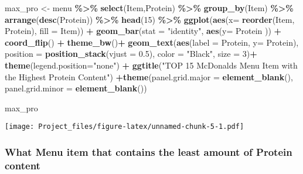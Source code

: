 \documentclass[
]{article}
\newenvironment{Shaded}{\begin{snugshade}}{\end{snugshade}}
\newcommand{\AttributeTok}[1]{\textcolor[rgb]{0.13,0.29,0.53}{#1}}
\newcommand{\DecValTok}[1]{\textcolor[rgb]{0.00,0.00,0.81}{#1}}
\newcommand{\FloatTok}[1]{\textcolor[rgb]{0.00,0.00,0.81}{#1}}
\newcommand{\FunctionTok}[1]{\textcolor[rgb]{0.13,0.29,0.53}{\textbf{#1}}}
\newcommand{\NormalTok}[1]{#1}
\newcommand{\OtherTok}[1]{\textcolor[rgb]{0.56,0.35,0.01}{#1}}
\newcommand{\SpecialCharTok}[1]{\textcolor[rgb]{0.81,0.36,0.00}{\textbf{#1}}}
\newcommand{\StringTok}[1]{\textcolor[rgb]{0.31,0.60,0.02}{#1}}
\begin{document}
\begin{Shaded}
\begin{Highlighting}[]
\NormalTok{max\_pro }\OtherTok{\textless{}{-}}\NormalTok{ menu }\SpecialCharTok{\%\textgreater{}\%} 
  \FunctionTok{select}\NormalTok{(Item,Protein) }\SpecialCharTok{\%\textgreater{}\%}  
  \FunctionTok{group\_by}\NormalTok{(Item) }\SpecialCharTok{\%\textgreater{}\%} 
  \FunctionTok{arrange}\NormalTok{(}\FunctionTok{desc}\NormalTok{(Protein)) }\SpecialCharTok{\%\textgreater{}\%} 
  \FunctionTok{head}\NormalTok{(}\DecValTok{15}\NormalTok{) }\SpecialCharTok{\%\textgreater{}\%} 
  \FunctionTok{ggplot}\NormalTok{(}\FunctionTok{aes}\NormalTok{(}\AttributeTok{x=} \FunctionTok{reorder}\NormalTok{(Item, }
\NormalTok{                        Protein),}
             \AttributeTok{fill =}\NormalTok{ Item)) }\SpecialCharTok{+} 
  \FunctionTok{geom\_bar}\NormalTok{(}\AttributeTok{stat =} \StringTok{"identity"}\NormalTok{,}
           \FunctionTok{aes}\NormalTok{(}\AttributeTok{y=}\NormalTok{ Protein )) }\SpecialCharTok{+}
  \FunctionTok{coord\_flip}\NormalTok{() }\SpecialCharTok{+}
  \FunctionTok{theme\_bw}\NormalTok{()}\SpecialCharTok{+} 
  \FunctionTok{geom\_text}\NormalTok{(}\FunctionTok{aes}\NormalTok{(}\AttributeTok{label =}\NormalTok{ Protein, }
                \AttributeTok{y=}\NormalTok{ Protein),}
            \AttributeTok{position =} \FunctionTok{position\_stack}\NormalTok{(}\AttributeTok{vjust =} \FloatTok{0.5}\NormalTok{),}
            \AttributeTok{color =} \StringTok{"Black"}\NormalTok{,}
            \AttributeTok{size =} \DecValTok{3}\NormalTok{)}\SpecialCharTok{+}
  \FunctionTok{theme}\NormalTok{(}\AttributeTok{legend.position=}\StringTok{"none"}\NormalTok{) }\SpecialCharTok{+}
  \FunctionTok{ggtitle}\NormalTok{(}\StringTok{"TOP 15 McDonald\textquotesingle{}s Menu Item with the Highest Protein Content"}\NormalTok{) }\SpecialCharTok{+}\FunctionTok{theme}\NormalTok{(}\AttributeTok{panel.grid.major =} \FunctionTok{element\_blank}\NormalTok{(), }\AttributeTok{panel.grid.minor =} \FunctionTok{element\_blank}\NormalTok{())}

\NormalTok{max\_pro}
\end{Highlighting}
\end{Shaded}

\texttt{[image: Project\_files/figure-latex/unnamed-chunk-5-1.pdf]}

\hypertarget{what-menu-item-that-contains-the-least-amount-of-protein-content}{%
\subsubsection{What Menu item that contains the least amount of Protein
content}\label{what-menu-item-that-contains-the-least-amount-of-protein-content}}
\end{document}
